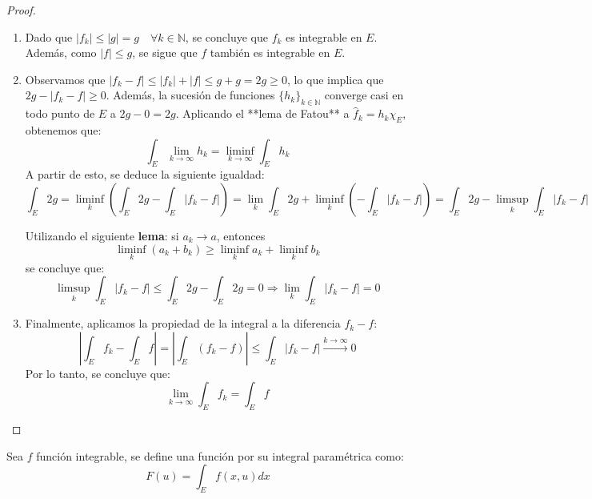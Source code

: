 \begin{proof}
    \leavevmode

    \begin{enumerate}
        \item Dado que \( |f_k| \leq |g| = g \quad \forall k \in \mathbb{N} \), se concluye
              que \( f_k \) es integrable en \( E \). Además, como \( |f| \leq g \), se sigue
              que \( f \) también es integrable en \( E \).

        \item Observamos que \( |f_k - f| \leq |f_k| + |f| \leq g + g = 2g \geq 0 \), lo que
              implica que \( 2g - |f_k - f| \geq 0 \). Además, la sucesión de funciones \(
              \{h_k\}_{k \in \mathbb{N}} \) converge casi en todo punto de \( E \) a \( 2g -
              0 = 2g \). Aplicando el **lema de Fatou** a \( \hat{f}_k = h_k \chi_{E} \),
              obtenemos que:
              \[
                  \int_{E} \lim_{k \to \infty} h_k = \liminf_{k \to \infty} \int_{E} h_k
              \]
              A partir de esto, se deduce la siguiente igualdad:
              \[
                  \int_E 2g = \liminf_{k} \left( \int_E 2g - \int_E |f_k - f| \right) = \lim_{k} \int_E 2g + \liminf_{k} \left( - \int_E |f_k - f| \right) = \int_E 2g - \limsup_{k} \int_E |f_k - f|
              \]

              Utilizando el siguiente \textbf{lema}: si \( a_k \to a \), entonces
              \[
                  \liminf_k (a_k + b_k) \geq \liminf_k a_k + \liminf_k b_k
              \]
              se concluye que:
              \[
                  \limsup_k \int_E |f_k - f| \leq \int_E 2g - \int_E 2g = 0 \Rightarrow \lim_k \int_E |f_k - f| = 0
              \]

        \item Finalmente, aplicamos la propiedad de la integral a la diferencia \( f_k - f
              \):
              \[
                  \left| \int_E f_k - \int_E f \right| = \left| \int_E (f_k - f) \right| \leq \int_E |f_k - f| \xrightarrow{k \to \infty} 0
              \]
              Por lo tanto, se concluye que:
              \[
                  \lim_{k \to \infty} \int_E f_k = \int_E f
              \]
    \end{enumerate}
\end{proof}
\begin{definición}
Sea $f$ función integrable, se define una función por su integral paramétrica como:
$$ F(u) = \int_{E}f(x, u)dx$$
\end{definición}
